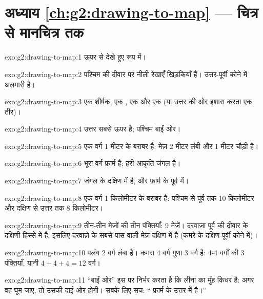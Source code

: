 \section*{अध्याय \ref{ch:g2:drawing-to-map} --- चित्र से मानचित्र तक}

\begin{solution}{exo:g2:drawing-to-map:1}
ऊपर से देखे हुए रूप में।
\end{solution}

\begin{solution}{exo:g2:drawing-to-map:2}
पश्चिम की दीवार पर नीली रेखाएँ खिड़कियाँ हैं। उत्तर-पूर्वी कोने में
अलमारी है।
\end{solution}

\begin{solution}{exo:g2:drawing-to-map:3}
एक शीर्षक, एक , एक  और एक  (या उत्तर की ओर इशारा करता एक तीर)।
\end{solution}

\begin{solution}{exo:g2:drawing-to-map:4}
उत्तर सबसे ऊपर है; पश्चिम बाईं ओर।
\end{solution}

\begin{solution}{exo:g2:drawing-to-map:5}
एक वर्ग 1 मीटर के बराबर है: मेज़ 2 मीटर लंबी और 1 मीटर चौड़ी है।
\end{solution}

\begin{solution}{exo:g2:drawing-to-map:6}
भूरा वर्ग फ़ार्म है; हरी आकृति जंगल है।
\end{solution}

\begin{solution}{exo:g2:drawing-to-map:7}
जंगल  के दक्षिण में है, और फ़ार्म के पूर्व में।
\end{solution}

\begin{solution}{exo:g2:drawing-to-map:8}
एक वर्ग 1 किलोमीटर के बराबर है: पश्चिम से पूर्व तक 10 किलोमीटर और
दक्षिण से उत्तर तक 8 किलोमीटर।
\end{solution}

\begin{solution}{exo:g2:drawing-to-map:9}
तीन-तीन मेज़ों की तीन पंक्तियाँ: 9 मेज़ें। दरवाज़ा पूर्व की दीवार के दक्षिणी
हिस्से में है, इसलिए दरवाज़े के सबसे पास वाली मेज़ दक्षिण में है (कमरे के
दक्षिण-पूर्वी कोने में)।
\end{solution}

\begin{solution}{exo:g2:drawing-to-map:10}
पलंग 2 वर्ग लंबा है। कमरा 4 वर्ग गुणा 3 वर्ग है: 4-4 वर्गों की 3 पंक्तियाँ,
यानी $4 + 4 + 4 = 12$ वर्ग।
\end{solution}

\begin{solution}{exo:g2:drawing-to-map:11}
``बाईं ओर'' इस पर निर्भर करता है कि लीना का मुँह किधर है: अगर वह घूम जाए,
तो  उसकी दाईं ओर होगी। सबके लिए सच: `` फ़ार्म के उत्तर में है।''
\end{solution}
